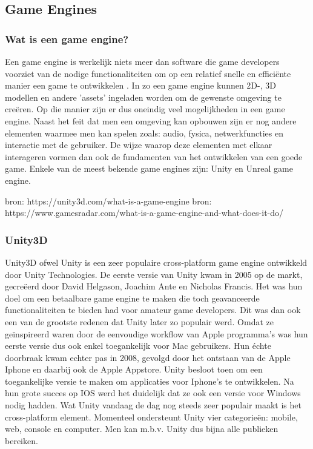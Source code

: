 \subsection{Game Engines}
\subsubsection{Wat is een game engine?}
Een game engine is werkelijk niets meer dan software die game developers voorziet van de nodige functionaliteiten om op een relatief snelle en efficiënte manier een game te ontwikkelen \autocite{Oculus2018}. In zo een game engine kunnen 2D-, 3D modellen en andere 'assets' ingeladen worden om de gewenste omgeving te creëren. Op die manier zijn er dus oneindig veel mogelijkheden in een game engine. Naast het feit dat men een omgeving kan opbouwen zijn er nog andere elementen waarmee men kan spelen zoals: audio, fysica, netwerkfuncties en interactie met de gebruiker. De wijze  waarop deze elementen met elkaar interageren vormen dan ook de fundamenten van het ontwikkelen van een goede game. Enkele van de meest bekende game engines zijn: Unity en Unreal game engine. \autocite{Staff2018}


bron: https://unity3d.com/what-is-a-game-engine
bron: https://www.gamesradar.com/what-is-a-game-engine-and-what-does-it-do/

\subsubsection{Unity3D}

Unity3D ofwel Unity is een zeer populaire cross-platform game engine ontwikkeld door Unity Technologies.
De eerste versie van Unity kwam in 2005 op de markt, gecreëerd door David Helgason, Joachim Ante en Nicholas Francis. Het was hun doel om een betaalbare game engine te maken die toch geavanceerde functionaliteiten te bieden had voor amateur game developers. Dit was dan ook een van de grootste redenen dat Unity later zo populair werd. Omdat ze geïnspireerd waren door de eenvoudige workflow van Apple programma's was hun eerste versie dus ook enkel toegankelijk voor Mac gebruikers. Hun échte doorbraak kwam echter pas in 2008, gevolgd door het ontstaan van de Apple Iphone en daarbij ook de Apple Appstore. Unity besloot toen om een toegankelijke versie te maken om applicaties voor Iphone's te ontwikkelen. Na hun grote succes op IOS werd het duidelijk dat ze ook een versie voor Windows nodig hadden. Wat Unity vandaag de dag nog steeds zeer populair maakt is het cross-platform element. Momenteel ondersteunt Unity vier categorieën: mobile, web, console en computer. Men kan m.b.v. Unity dus bijna alle publieken bereiken.

